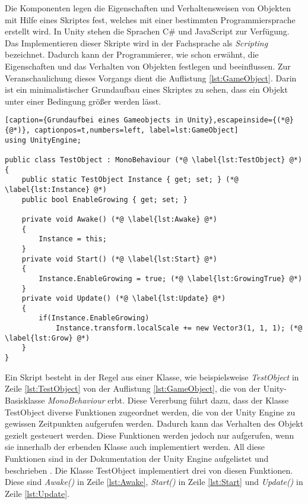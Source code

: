 Die Komponenten legen die Eigenschaften und Verhaltensweisen von Objekten mit Hilfe eines Skriptes fest, welches mit einer bestimmten Programmiersprache erstellt wird. In Unity stehen die Sprachen C\# und JavaScript zur Verfügung. Das Implementieren dieser Skripte wird in der Fachsprache als \textit{Scripting} bezeichnet. Dadurch kann der Programmierer, wie schon erwähnt, die Eigenschaften und das Verhalten von Objekten festlegen und beeinflussen. Zur Veranschaulichung dieses Vorgangs dient die Auflistung \ref{lst:GameObject}. Darin ist ein minimalistischer Grundaufbau eines Skriptes zu sehen, dass ein Objekt unter einer Bedingung größer werden lässt.\\


\begin{lstlisting}[caption={Grundaufbei eines Gameobjects in Unity},escapeinside={(*@}{@*)}, captionpos=t,numbers=left, label=lst:GameObject]
using UnityEngine;

public class TestObject : MonoBehaviour (*@ \label{lst:TestObject} @*)
{
    public static TestObject Instance { get; set; } (*@ \label{lst:Instance} @*)
    public bool EnableGrowing { get; set; }

    private void Awake() (*@ \label{lst:Awake} @*)
    {
        Instance = this;
    }
    private void Start() (*@ \label{lst:Start} @*)
    {
        Instance.EnableGrowing = true; (*@ \label{lst:GrowingTrue} @*)
    }
    private void Update() (*@ \label{lst:Update} @*)
    {
    	if(Instance.EnableGrowing)
        	Instance.transform.localScale += new Vector3(1, 1, 1); (*@ \label{lst:Grow} @*)
    }
}
\end{lstlisting}
\quad


Ein Skript besteht in der Regel aus einer Klasse, wie beispielsweise \textit{TestObject} in Zeile \ref{lst:TestObject} von der Auflistung \ref{lst:GameObject}, die von der Unity-Basisklasse \textit{MonoBehaviour} erbt. Diese Vererbung führt dazu, dass der Klasse TestObject diverse Funktionen zugeordnet werden, die von der Unity Engine zu gewissen Zeitpunkten aufgerufen werden. Dadurch kann das Verhalten des Objekt gezielt gesteuert werden. Diese Funktionen werden jedoch nur aufgerufen, wenn sie innerhalb der erbenden Klasse auch implementiert werden. All diese Funktionen sind in der Dokumentation der Unity Engine aufgelistet und beschrieben \cite{bib:MonoBehaviour}. Die Klasse TestObject implementiert drei von diesen Funktionen. Diese sind \textit{Awake()} in Zeile \ref{lst:Awake}, \textit{Start()} in Zeile \ref{lst:Start} und \textit{Update()} in Zeile \ref{lst:Update}.\\

